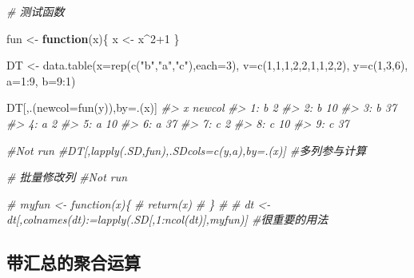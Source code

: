 \documentclass[
]{book}
\newenvironment{Shaded}{\begin{snugshade}}{\end{snugshade}}
\newcommand{\AttributeTok}[1]{\textcolor[rgb]{0.77,0.63,0.00}{#1}}
\newcommand{\CommentTok}[1]{\textcolor[rgb]{0.56,0.35,0.01}{\textit{#1}}}
\newcommand{\ControlFlowTok}[1]{\textcolor[rgb]{0.13,0.29,0.53}{\textbf{#1}}}
\newcommand{\DecValTok}[1]{\textcolor[rgb]{0.00,0.00,0.81}{#1}}
\newcommand{\FunctionTok}[1]{\textcolor[rgb]{0.00,0.00,0.00}{#1}}
\newcommand{\NormalTok}[1]{#1}
\newcommand{\OtherTok}[1]{\textcolor[rgb]{0.56,0.35,0.01}{#1}}
\newcommand{\SpecialCharTok}[1]{\textcolor[rgb]{0.00,0.00,0.00}{#1}}
\newcommand{\StringTok}[1]{\textcolor[rgb]{0.31,0.60,0.02}{#1}}
\begin{document}
\begin{Shaded}
\begin{Highlighting}[]
\CommentTok{\# 测试函数}

\NormalTok{fun }\OtherTok{\textless{}{-}} \ControlFlowTok{function}\NormalTok{(x)\{}
\NormalTok{  x }\OtherTok{\textless{}{-}}\NormalTok{ x}\SpecialCharTok{\^{}}\DecValTok{2}\SpecialCharTok{+}\DecValTok{1}
\NormalTok{\}}

\NormalTok{DT }\OtherTok{\textless{}{-}}  \FunctionTok{data.table}\NormalTok{(}\AttributeTok{x=}\FunctionTok{rep}\NormalTok{(}\FunctionTok{c}\NormalTok{(}\StringTok{"b"}\NormalTok{,}\StringTok{"a"}\NormalTok{,}\StringTok{"c"}\NormalTok{),}\AttributeTok{each=}\DecValTok{3}\NormalTok{), }\AttributeTok{v=}\FunctionTok{c}\NormalTok{(}\DecValTok{1}\NormalTok{,}\DecValTok{1}\NormalTok{,}\DecValTok{1}\NormalTok{,}\DecValTok{2}\NormalTok{,}\DecValTok{2}\NormalTok{,}\DecValTok{1}\NormalTok{,}\DecValTok{1}\NormalTok{,}\DecValTok{2}\NormalTok{,}\DecValTok{2}\NormalTok{), }\AttributeTok{y=}\FunctionTok{c}\NormalTok{(}\DecValTok{1}\NormalTok{,}\DecValTok{3}\NormalTok{,}\DecValTok{6}\NormalTok{), }\AttributeTok{a=}\DecValTok{1}\SpecialCharTok{:}\DecValTok{9}\NormalTok{, }\AttributeTok{b=}\DecValTok{9}\SpecialCharTok{:}\DecValTok{1}\NormalTok{)}

\NormalTok{DT[,.(}\AttributeTok{newcol=}\FunctionTok{fun}\NormalTok{(y)),by}\OtherTok{=}\NormalTok{.(x)]}
\CommentTok{\#\textgreater{}    x newcol}
\CommentTok{\#\textgreater{} 1: b      2}
\CommentTok{\#\textgreater{} 2: b     10}
\CommentTok{\#\textgreater{} 3: b     37}
\CommentTok{\#\textgreater{} 4: a      2}
\CommentTok{\#\textgreater{} 5: a     10}
\CommentTok{\#\textgreater{} 6: a     37}
\CommentTok{\#\textgreater{} 7: c      2}
\CommentTok{\#\textgreater{} 8: c     10}
\CommentTok{\#\textgreater{} 9: c     37}

\CommentTok{\#Not run}
\CommentTok{\#DT[,lapply(.SD,fun),.SDcols=c(\textquotesingle{}y\textquotesingle{},\textquotesingle{}a\textquotesingle{}),by=.(x)] \#多列参与计算}


\CommentTok{\# 批量修改列}
\CommentTok{\#Not run}

\CommentTok{\# myfun \textless{}{-} function(x)\{}
\CommentTok{\#   return(x)}
\CommentTok{\# \}}
\CommentTok{\# }
\CommentTok{\# dt \textless{}{-} dt[,colnames(dt):=lapply(.SD[,1:ncol(dt)],myfun)] \#很重要的用法}
\end{Highlighting}
\end{Shaded}

\hypertarget{ux5e26ux6c47ux603bux7684ux805aux5408ux8fd0ux7b97}{%
\subsection{带汇总的聚合运算}\label{ux5e26ux6c47ux603bux7684ux805aux5408ux8fd0ux7b97}}
\end{document}
